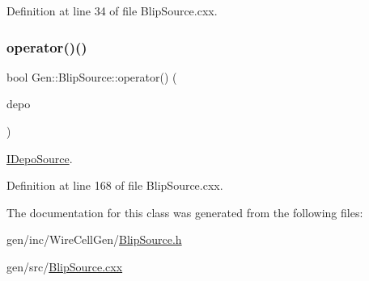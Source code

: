 Definition at line 34 of file Blip\+Source.\+cxx.

\mbox{\label{class_wire_cell_1_1_gen_1_1_blip_source_a04f9ea72bc88d9e81a8254d6dd928b3a}} 
\subsubsection{\texorpdfstring{operator()()}{operator()()}}
{\footnotesize\ttfamily bool Gen\+::\+Blip\+Source\+::operator() (\begin{DoxyParamCaption}\item[{\hyperlink{class_wire_cell_1_1_i_data_aff870b3ae8333cf9265941eef62498bc}{I\+Depo\+::pointer} \&}]{depo }\end{DoxyParamCaption})\hspace{0.3cm}{\ttfamily [virtual]}}



\hyperlink{class_wire_cell_1_1_i_depo_source}{I\+Depo\+Source}. 



Definition at line 168 of file Blip\+Source.\+cxx.



The documentation for this class was generated from the following files\+:\begin{DoxyCompactItemize}
\item 
gen/inc/\+Wire\+Cell\+Gen/\hyperlink{_blip_source_8h}{Blip\+Source.\+h}\item 
gen/src/\hyperlink{_blip_source_8cxx}{Blip\+Source.\+cxx}\end{DoxyCompactItemize}
